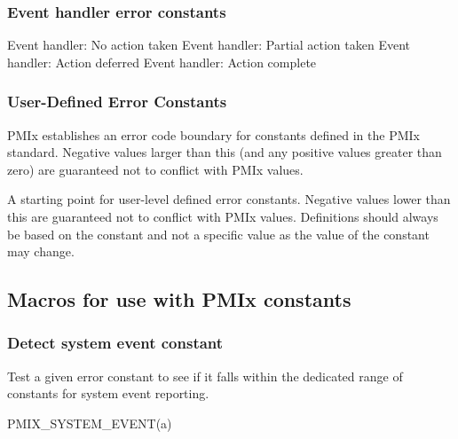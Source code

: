 \subsubsection{Event handler error constants}

\begin{constantdesc}
%
Event handler: No action taken
%
Event handler: Partial action taken
%
Event handler: Action deferred
%
Event handler: Action complete
%
\end{constantdesc}

\subsubsection{User-Defined Error Constants}
\label{api:struct:usererrors}

\ac{PMIx} establishes an error code boundary for constants defined in the \ac{PMIx} standard. Negative values larger than this (and any positive values greater than zero) are guaranteed not to conflict with \ac{PMIx} values.

\begin{constantdesc}
%
A starting point for user-level defined error constants.
Negative values lower than this are guaranteed not to conflict with \ac{PMIx} values.
Definitions should always be based on the  constant and not a specific value as the value of the constant may change.
%
\end{constantdesc}

\subsection{Macros for use with PMIx constants}

\subsubsection{Detect system event constant}

Test a given error constant to see if it falls within the dedicated range of constants for system event reporting.

\cspecificstart
\begin{codepar}
PMIX_SYSTEM_EVENT(a)
\end{codepar}
\cspecificend

